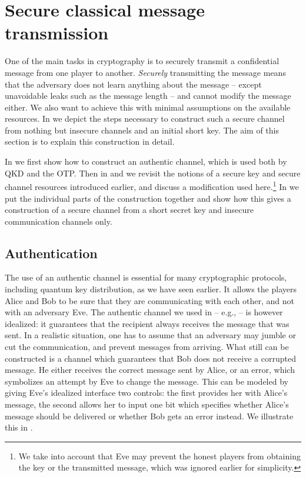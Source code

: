 \section{Secure classical message transmission}
\label{sec:smt}

One of the main tasks in cryptography is to securely transmit a confidential message from one player to another. \emph{Securely} transmitting the message means that the adversary does not learn anything about the message \--- except unavoidable leaks such as the message length \--- and cannot modify the message either. 
We also want to achieve this with minimal assumptions on the available resources. In  we depict the steps necessary to construct such a secure channel from nothing but insecure channels and an initial short key. The aim of this section is to explain this construction in detail. 

In  we first show how to construct an authentic
channel, which is used both by QKD and the OTP. Then in
 and  we revisit the notions
of a secure key and secure channel resources introduced earlier, and
discuss a modification used here.\footnote{We take into account that
  Eve may prevent the honest players from obtaining the key or the
  transmitted message, which was ignored earlier for simplicity.} In
 we put the individual parts of the
construction together and show how this gives a construction of a
secure channel from a short secret key and insecure communication
channels only.

\subsection{Authentication}
\label{sec:smt.auth}

The use of an authentic channel is essential for many cryptographic
protocols, including quantum key distribution, as we have seen
earlier. It allows the players Alice and Bob to be sure that they
are communicating with each other, and not with an adversary Eve. The
authentic channel we used in  \--- e.g.,
 \--- is however idealized: it guarantees that
the recipient always receives the message that was sent. In a
realistic situation, one has to assume that an adversary may jumble or
cut the communication, and prevent messages from arriving. What still
can be constructed is a channel which guarantees that Bob does not
receive a corrupted message. He either receives the correct message
sent by Alice, or an error, which symbolizes an attempt by Eve to
change the message. This can be modeled by giving Eve's idealized
interface two controls: the first provides her with Alice's message,
the second allows her to input one bit which specifies whether Alice's
message should be delivered or whether Bob gets an error instead. We
illustrate this in .

